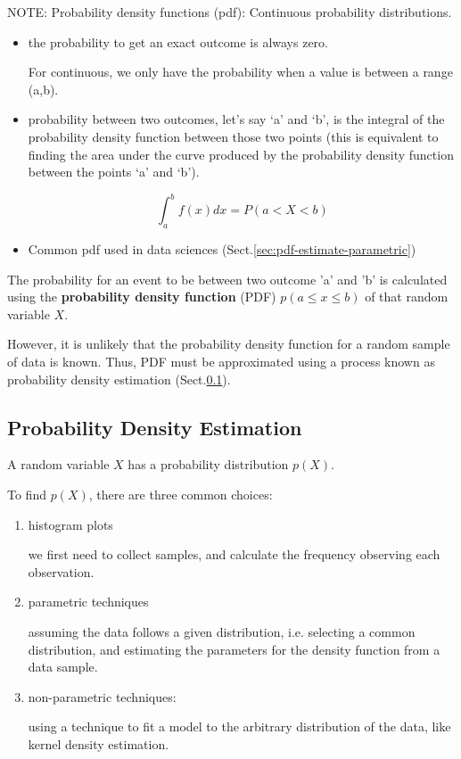 NOTE: Probability density functions (pdf): Continuous probability distributions.
\begin{itemize}
  
  \item the probability to get an exact outcome is always zero.
  
  For continuous, we only have the probability when a value is between a range (a,b).
  
  \item  probability between two outcomes, let’s say ‘a’ and ‘b’, is the
  integral of the probability density function between those two points (this is
  equivalent to finding the area under the curve produced by the probability
  density function between the points ‘a’ and ‘b’).
  
\begin{equation}
\int_a^b f(x)dx = P(a<X<b)
\end{equation}

  \item  Common pdf used in data sciences (Sect.\ref{sec:pdf-estimate-parametric})
\end{itemize}

The probability for an event to be between two outcome 'a' and 'b' is calculated
using the {\bf probability density function} (PDF) $p(a\le x \le b)$ of that
random variable $X$.

However, it is unlikely that the probability density function for a random
sample of data is known. Thus, PDF must be approximated using a process known as
probability density estimation (Sect.\ref{sec:probability-density-estimation}).

\subsection{Probability Density Estimation}
\label{sec:probability-density-estimation}

A random variable $X$ has a probability distribution $p(X)$.


To find $p(X)$, there are three common choices:

\begin{enumerate}
  \item histogram plots
  
  we first need to collect samples, and calculate the frequency observing each observation.

  \item parametric techniques
  
   assuming the data follows a given distribution, i.e. selecting a common
   distribution, and estimating the parameters for the density function from a
   data sample.
   
  \item non-parametric techniques:
  
  using a technique to fit a model to the arbitrary distribution of the data,
  like kernel density estimation.
  
\end{enumerate}

